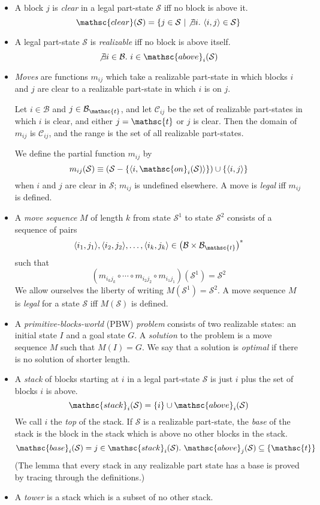 \documentclass{article}
\newcommand{\have}{{.~}}
\newcommand{\bstate}{{\mathcal{S}}}
\newcommand{\blocks}{{\mathcal{B}}}
\newcommand{\tabtop}{{\mathsc{t}}}
\newcommand{\tblocks}{{\blocks_\tabtop}}
\newcommand{\bclear}{{\mathsc{clear}}}
\newcommand{\bon}{{\mathsc{on}}}
\newcommand{\babove}{{\mathsc{above}}}
\newcommand{\bstack}{{\mathsc{stack}}}
\newcommand{\bbase}{{\mathsc{base}}}
\newcommand{\st}{~|}
\begin{document}
\begin{itemize}
\item A block $j$ is {\em clear} in a legal part-state $\bstate$ iff no block
is above it. $$
  \bclear(\bstate) = \{ j \in \bstate \st
  \not\exists i \have \langle i , j \rangle \in \bstate \}
$$

\item A legal part-state $\bstate$ is {\em realizable} iff
no block is above itself. $$
  \not\exists i \in \blocks \have
    i \in \babove_i(\bstate)
$$

\item {\em Moves} are functions $m_{ij}$ which take a realizable part-state in
which blocks $i$ and $j$ are clear to a
realizable part-state in which $i$ is on $j$.

Let $i \in \blocks$ and $j \in \tblocks$, and let $\mathcal{C}_{ij}$ be the set
of realizable part-states
in which $i$ is clear, and either $j = \tabtop$ or $j$ is clear.
Then the domain of $m_{ij}$ is
$\mathcal{C}_{ij}$, and the range is the set of all realizable part-states.

We define the partial function $m_{ij}$ by $$
  m_{ij}(\bstate) \equiv
    \left ( \bstate - \{ \langle i, \bon_i(\bstate) \rangle \} \right )
    \cup \{ \langle i, j \rangle \}
$$
when $i$ and $j$ are clear in $\bstate$; $m_{ij}$ is undefined
elsewhere.  A move is {\em legal} iff $m_{ij}$ is defined.

\item A {\em move sequence} $M$
of length $k$ from state $\bstate^1$ to state $\bstate^2$ consists of
a sequence of pairs $$
  \langle i_1, j_1 \rangle , \langle i_2 , j_2 \rangle , \ldots ,
  \langle i_k , j_k \rangle \in \left ( \blocks \times \tblocks \right ) ^ \ast
$$
such that $$
  \left ( m_{i_k j_k} \circ \cdots \circ m_{i_2 j_2} \circ
  m_{i_1 j_1} \right ) (\bstate^1) = \bstate^2
$$
We allow ourselves the liberty of writing $M(\bstate^1) = \bstate^2$.
A move sequence $M$ is {\em legal} for a state $\bstate$ iff
$M(\bstate)$ is defined.

\item A {\em primitive-blocks-world} (PBW) {\em problem} consists of two
realizable states: an
initial state $I$ and a goal state $G$.
A {\em solution} to the problem is a move sequence $M$ such that $M(I) = G$.
We say that a solution is {\em optimal} if there is no solution
of shorter length.

\item A {\em stack} of blocks starting at $i$ in a
legal part-state $\bstate$ is just
$i$ plus the set of blocks $i$ is above. $$
  \bstack_i(\bstate) = \{ i \} \cup \babove_i(\bstate)
$$
We call $i$ the {\em top} of the stack.
If $\bstate$ is a realizable part-state, the {\em base}
of the stack is the block in the stack which is
above no other blocks in the stack. $$
  \bbase_i(\bstate) = j \in \bstack_i(\bstate) \have
    \babove_j(\bstate) \subseteq \{ \tabtop \}
$$
(The lemma that every stack in any realizable part state
has a base is proved by tracing through the definitions.)

\item A {\em tower} is a stack which is a subset of no other
stack.  

\end{itemize}
\end{document}
